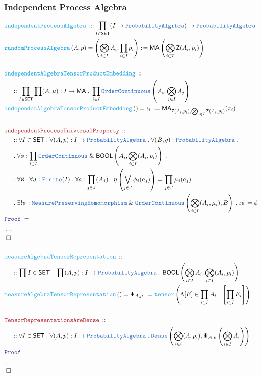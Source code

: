 \documentclass[12pt]{scrartcl}
\newcommand{\TYPE}[1]{\textcolor{NavyBlue}{\mathtt{#1}}}
\newcommand{\FUNC}[1]{\textcolor{Cerulean}{\mathtt{#1}}}
\newcommand{\LOGIC}[1]{\textcolor{Blue}{\mathtt{#1}}}
\newcommand{\THM}[1]{\textcolor{Maroon}{\mathtt{#1}}}
\renewcommand{\.}{\; . \;}
\newcommand{\de}{: \kern 0.1pc =}
\newcommand{\Act}[1]{\left( #1 \right)}
\newcommand{\Theorem}[2]{& \THM{#1} \, :: \, #2 \\ & \Proof = \\ }
\newcommand{\DeclareFunc}[2]{& \FUNC{#1} \, :: \, #2 \\}
\newcommand{\DefineNamedFunc}[4]{&  \FUNC{#1}\Act{#2} = #3 \de #4 \\}
\newcommand{\NewLine}{\\ & \kern 1pc}
\newcommand{\Page}[1]{ \begin{align*} #1 \end{align*}   }
\newcommand{\NoProof}{ & \ldots \\ \EndProof}
\renewcommand{\And}{\; \& \;}
\newcommand{\QED}{\; \square}
\newcommand{\EndProof}{& \QED \\}
\newcommand{\Proof}{\LOGIC{Proof} \; }
\newcommand{\Finite}{\TYPE{Finite}}
\newcommand{\I}{\mathcal{I}}
\newcommand{\SET}{\mathsf{SET}}
\newcommand{\oC}{\TYPE{OrderContinuous}}
\newcommand{\BOOL}{\mathsf{BOOL}}
\newcommand{\Z}{\mathsf{Z}}
\newcommand{\Dense}{\TYPE{Dense}}
\newcommand{\MPH}{\TYPE{MeasurePreservingHomomorphism}}
\newcommand{\ma}{\mathsf{MA}}
\begin{document}
\subsubsection{Independent Process Algebra}
\Page{
	\DeclareFunc{independentProcessAlgebra}
	{
		\prod_{I \in \SET}  (I \to \TYPE{ProbabilityAlgrbra} ) \to \TYPE{ProbabilityAlgebra}             
	}
	\DefineNamedFunc{randomProcessAlgebra}{A, p}{
		\left(\bigotimes_{i \in I} A_i, \prod_{i \in I} p_i\right)}
		{
					\ma\left( \bigotimes_{i \in \I} \Z(A_i, p_i) \right)
		}
		\\
	\DeclareFunc{independentAlgebraTensorProductEmbedding}
	{
		\NewLine ::		
		\prod_{I \in \SET}
		\prod (A,\mu) : I \to \ma \.
		\prod_{i \in I} \oC\left( A_i , \bigotimes_{j \in I} A_j \right)
	} 
	\DefineNamedFunc{independetAlgebraTensorProductEmbedding}{}{\iota_i}
	{
		\ma_{\Z(A_i,p_i),\bigotimes_{i \in I} \Z(A_i,p_i)}( \pi_i   )
	}
	\\
	\Theorem{independentProcessUniversalProperty}
	{
		\NewLine ::
		\forall I \in \SET \.
		\forall (A, p) : I \to \TYPE{ProbabilityAlgebra} \.
		\forall (B, q) :   \TYPE{ProbabilityAlgebra} \. \NewLine \.
		\forall \phi : \prod_{i \in I} \oC \And \BOOL\left(A_i, \bigotimes_{i \in I} (A_i,p_i) \right) \.
		\NewLine \. 
		\forall \aleph : \forall J : \Finite(I) \. \forall a : \prod_{j \in J}(A_j)  \. 
		\eta\left( \bigvee_{j \in J} \phi_j(a_j) \right) = \prod_{j \in J} \mu_j(a_j) \. \NewLine \.
		\exists! \psi : \MPH \And \oC\left(\bigotimes_{i \in I} (A_i,\mu_i), B\right) \.  \iota \psi = \phi
	}
	\NoProof
	\\
	\DeclareFunc{measureAlgebraTensorRepresentation}
	{
		\NewLine ::		
		\prod I \in \SET \. 
		\prod (A,p) : I \to \TYPE{ProbabilityAlgebra} \.
		\BOOL \left( \bigotimes_{i \in I} A_i, \bigotimes_{i \in I} (A_i,p_i) \right)
	} 
	\DefineNamedFunc{measureAlgebraTensorRepresentation}{}{\Psi_{A,\mu}}
	{
		    \FUNC{tensor}\left( 
		    	\Lambda [E] \in \prod_{i \in I} A_i \. \left[ \prod_{i \in I} E_i \right]
		    \right)
	}
	\\
	\Theorem{TensorRepresentationsAreDense}
	{
		\NewLine ::		
		\forall I \in \SET \.
		\forall (A,p) : I \to \TYPE{ProbabilityAlgebra} \.
		\Dense\left( \bigotimes_{i \in i} (A,p_i), \Psi_{A,\mu}\left( \bigotimes_{i \in I} A_i \right) \right)
	}
	\NoProof
}
\newpage
\end{document}
